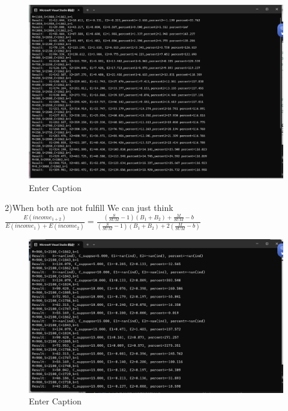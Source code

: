 \documentclass{article}
\begin{document}
\begin{figure}
    \centering
    \includegraphics[width=1\linewidth]{1.png}
    \caption{Enter Caption}
    \label{fig:enter-label}
\end{figure}
\par2)When both are not fulfill
We can just think $\frac{E(income_{1+2})}{E(income_1)+E(income_2)}=\frac{(\frac{S}{SUM}-1)(B_1+B_2)+\frac{M}{SUM}-b}{(\frac{S}{SUM}-1)(B_1+B_2)+2(\frac{M}{SUM}-b)}$
\begin{figure}
    \centering
    \includegraphics[width=1\linewidth]{4.png}
    \caption{Enter Caption}
    \label{fig:enter-label}

\end{figure}
\end{document}
